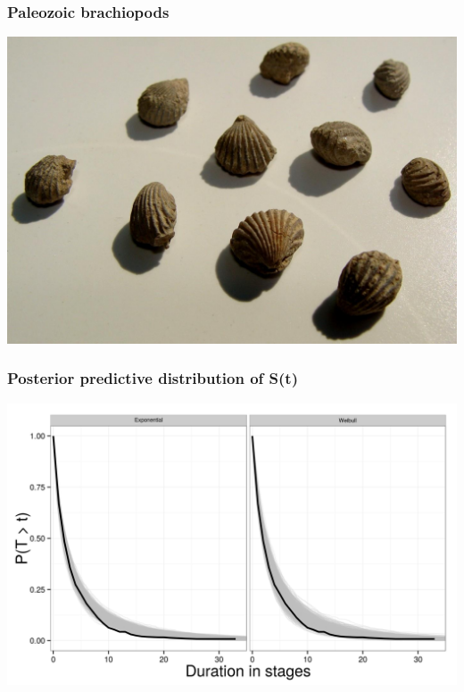 \documentclass{beamer}
\begin{document}
\begin{frame}
  \frametitle{Paleozoic brachiopods}
  \begin{center}
    \includegraphics[width = \textwidth,height = 0.8\textheight,keepaspectratio = true]{figure/permian_brac}
  \end{center}
\end{frame}

\begin{frame}
  \frametitle{Posterior predictive distribution of S(t)}

  \begin{center}
    \includegraphics[width = \textwidth,height = 0.8\textheight,keepaspectratio = true]{figure/survival_curves}
  \end{center}
\end{frame}
\end{document}
